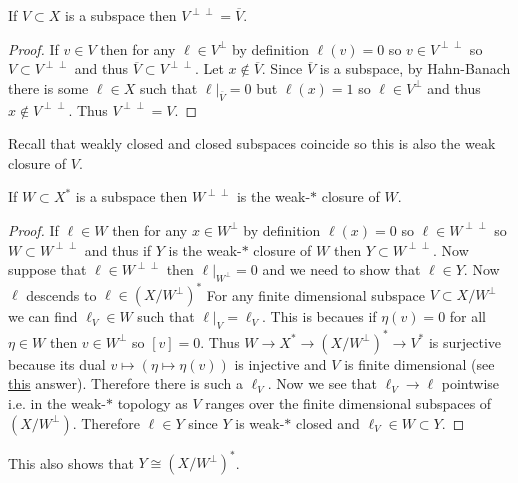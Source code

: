 \documentclass[12pt]{article}
\begin{document}
\begin{lemma}
If $V \subset X$ is a subspace then $V^{\perp \perp} = \overline{V}$.
\end{lemma}

\begin{proof}
If $v \in V$ then for any $\ell \in V^\perp$ by definition $\ell(v) = 0$ so $v \in V^{\perp \perp}$ so $V \subset V^{\perp \perp}$ and thus $\overline{V} \subset V^{\perp \perp}$. Let $x \notin \overline{V}$. Since $\overline{V}$ is a subspace, by Hahn-Banach there is some $\ell \in X$ such that $\ell|_{\overline{V}} = 0$ but $\ell(x) = 1$ so $\ell \in V^\perp$ and thus $x \notin V^{\perp\perp}$. Thus $V^{\perp\perp} = V$.
\end{proof}

\begin{rmk}
Recall that weakly closed and closed subspaces coincide so this is also the weak closure of $V$.
\end{rmk}

\begin{lemma}
If $W \subset X^*$ is a subspace then $W^{\perp \perp}$ is the weak-$*$ closure of $W$.
\end{lemma}

\begin{proof}
If $\ell \in W$ then for any $x \in W^\perp$ by definition $\ell(x) = 0$ so $\ell \in W^{\perp\perp}$ so $W \subset W^{\perp\perp}$ and thus if $Y$ is the weak-$*$ closure of $W$ then $Y \subset W^{\perp \perp}$. Now suppose that $\ell \in W^{\perp\perp}$ then $\ell|_{W^\perp} = 0$ and we need to show that $\ell \in Y$. Now $\ell$ descends to $\ell \in (X / W^\perp)^*$ For any finite dimensional subspace $V \subset X/W^\perp$ we can find $\ell_V \in W$ such that $\ell|_V = \ell_V$. This is becaues if $\eta(v) = 0$ for all $\eta \in W$ then $v \in W^\perp$ so $[v] = 0$. Thus $W \to X^* \to (X/W^\perp)^* \to V^*$ is surjective because its dual $v \mapsto (\eta \mapsto \eta(v))$ is injective and $V$ is finite dimensional (see \href{https://math.stackexchange.com/questions/3743687/weak-closed-subspaces-and-preduals-a-la-von-neumann-algebras}{this} answer). Therefore there is such a $\ell_V$. Now we see that $\ell_V \to \ell$ pointwise i.e. in the weak-$*$ topology as $V$ ranges over the finite dimensional subspaces of $(X / W^\perp)$. Therefore $\ell \in Y$ since $Y$ is weak-$*$ closed and $\ell_V \in W \subset Y$.
\end{proof}

\begin{rmk}
This also shows that $Y \cong (X / W^\perp)^*$.
\end{rmk}
\end{document}
